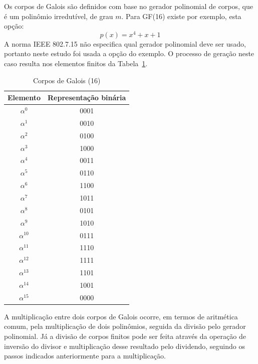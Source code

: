 	Os corpos de Galois são definidos com base no gerador polinomial de corpos, que é um polinômio irredutível, de grau $m$. Para GF(16) existe por exemplo, esta opção:
	\begin{equation}
	p(x) = x^{4} + x + 1
	\end{equation}
	A norma IEEE 802.7.15 não especifica qual gerador polinomial deve ser usado, portanto neste estudo foi usada a opção do exemplo. O processo de geração neste caso resulta nos elementos finitos da Tabela~\ref{tab:galois}.
	\begin{table}[]
		\centering
		\caption{Corpos de Galois (16)}
		\label{tab:galois}
		\begin{tabular}{|c|c|}
			\hline
			Elemento & Representação binária \\ \hline
			$\alpha^{0}$   & 0001                  \\ \hline
			$\alpha^{1}$   & 0010                  \\ \hline
			$\alpha^{2}$   & 0100                  \\ \hline
			$\alpha^{3}$   & 1000                  \\ \hline
			$\alpha^{4}$   & 0011                  \\ \hline
			$\alpha^{5}$   & 0110                  \\ \hline
			$\alpha^{6}$   & 1100                  \\ \hline
			$\alpha^{7}$   & 1011                  \\ \hline
			$\alpha^{8}$   & 0101                  \\ \hline
			$\alpha^{9}$   & 1010                  \\ \hline
			$\alpha^{10}$  & 0111                  \\ \hline
			$\alpha^{11}$  & 1110                  \\ \hline
			$\alpha^{12}$  & 1111                  \\ \hline
			$\alpha^{13}$  & 1101                  \\ \hline
			$\alpha^{14}$  & 1001                  \\ \hline
			$\alpha^{15}$  & 0000                  \\ \hline
		\end{tabular}
	\end{table}

	A multiplicação entre dois corpos de Galois ocorre, em termos de aritmética comum, pela multiplicação de dois polinômios, seguida da divisão pelo gerador polinomial. Já a divisão  de corpos finitos pode ser feita através da operação de inversão do divisor e multiplicação desse resultado pelo dividendo, seguindo os passos indicados anteriormente para a multiplicação.

